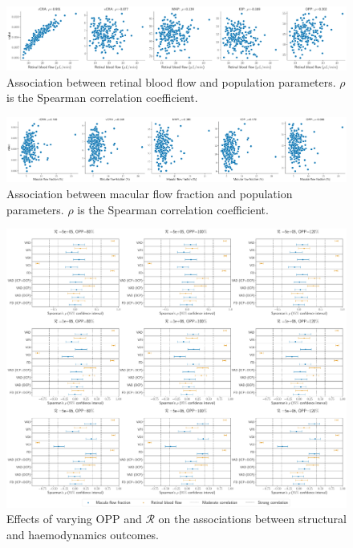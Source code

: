 \documentclass[11pt,]{article}
\begin{document}
\begin{figure}[ht!]
  \centering
  \includegraphics[width=.95\textwidth]{ParametersVP-To-TRBF}
  \caption{Association between retinal blood flow and population parameters. $\rho$ is the Spearman correlation coefficient.}
  \label{fig:sup-TRBF}
\end{figure}

\begin{figure}[ht!]
  \centering
  \includegraphics[width=.95\textwidth]{ParametersVP-To-MFR}
  \caption{Association between macular flow fraction and population parameters. $\rho$ is the Spearman correlation coefficient.}
  \label{fig:sup-MFR}
\end{figure}

\begin{figure}[ht!]
  \centering
  \includegraphics[width=\textwidth]{UQ_SpearmanCoefficients}
  \caption{\label{fig:sup-UQ-Coefficients}Effects of varying OPP and $\mathcal R$ on the associations between structural and haemodynamics outcomes.}
\end{figure}
\end{document}
